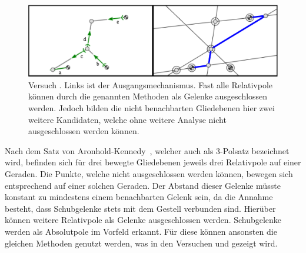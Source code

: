 \begin{figure}
    \includegraphics[width=\textwidth]{gfx/gruppe4_3_edit.png}
    \caption[Versuch ]{Versuch . Links ist der Ausgangsmechanismus. Fast alle Relativpole können durch die genannten Methoden als Gelenke ausgeschlossen werden. Jedoch bilden die nicht benachbarten Gliedebenen hier zwei weitere Kandidaten, welche ohne weitere Analyse nicht ausgeschlossen werden können.}
    \label{fig:gruppe4_3}
\end{figure}

Nach dem Satz von Aronhold-Kennedy~\cite{Goessner2016, Kerle2016}, welcher auch als 3-Polsatz bezeichnet wird, befinden sich für drei bewegte Gliedebenen jeweils drei Relativpole auf einer Geraden.
Die Punkte, welche nicht ausgeschlossen werden können, bewegen sich entsprechend auf einer solchen Geraden.
Der Abstand dieser Gelenke müsste konstant zu mindestens einem benachbarten Gelenk sein, da die Annahme besteht, dass Schubgelenke stets mit dem Gestell verbunden sind.
Hierüber können weitere Relativpole als Gelenke ausgeschlossen werden.
Schubgelenke werden als Absolutpole im Vorfeld erkannt.
Für diese können ansonsten die gleichen Methoden genutzt werden, was in den Versuchen  und  gezeigt wird.
